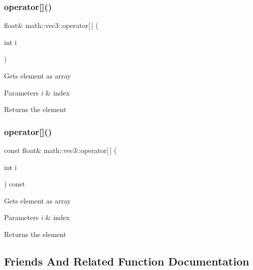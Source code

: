\subsubsection{\texorpdfstring{operator[]()}{operator[]()}\hspace{0.1cm}{\footnotesize\ttfamily [1/2]}}
{\footnotesize\ttfamily float\& math\+::vec3\+::operator\mbox{[}$\,$\mbox{]} (\begin{DoxyParamCaption}\item[{int}]{i }\end{DoxyParamCaption})\hspace{0.3cm}{\ttfamily [inline]}}

Gets element as array 
\begin{DoxyParams}{Parameters}
{\em i} & index \\
\hline
\end{DoxyParams}
\begin{DoxyReturn}{Returns}
the element 
\end{DoxyReturn}
\mbox{\label{structmath_1_1vec3_aa3618efa56c52bafa76101a4c614bed6}} 
\subsubsection{\texorpdfstring{operator[]()}{operator[]()}\hspace{0.1cm}{\footnotesize\ttfamily [2/2]}}
{\footnotesize\ttfamily const float\& math\+::vec3\+::operator\mbox{[}$\,$\mbox{]} (\begin{DoxyParamCaption}\item[{int}]{i }\end{DoxyParamCaption}) const\hspace{0.3cm}{\ttfamily [inline]}}

Gets element as array 
\begin{DoxyParams}{Parameters}
{\em i} & index \\
\hline
\end{DoxyParams}
\begin{DoxyReturn}{Returns}
the element 
\end{DoxyReturn}


\subsection{Friends And Related Function Documentation}
\mbox{\label{structmath_1_1vec3_a4bd64a414e31d04644f4caec34fcb8af}} 
